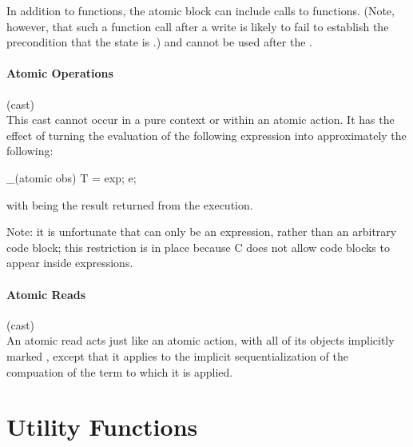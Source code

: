 \documentclass[preprint,nocopyrightspace]{sigplanconf}
\newcommand{\subsubsubsection}[1]{\paragraph{#1}}
\begin{document}
{{{\begin{VCC}
In addition to  functions, the atomic block can
include calls to  functions. (Note, however, that such a
function call after a write is likely to fail to establish the
precondition that the state is .) 
and  cannot be used after the .

\subsubsubsection{Atomic Operations}

\noindent{} (cast)\\
This cast cannot occur in a pure context or within an atomic action.
It has the effect of turning the evaluation of the following
expression  into approximately the following:
\begin{VCC}
_(atomic obs) {
  T \result = exp;
  e;
}
\end{VCC}
with \vcc{\result} being the result returned from the execution. 

Note: it is unfortunate that  can only be an expression, rather
than an arbitrary code block; this restriction is in place because C
does not allow code blocks to appear inside expressions. 

\subsubsubsection{Atomic Reads}

 (cast)\\
An atomic read acts just like an atomic action, with all of its
objects implicitly marked , except that it applies
to the implicit sequentialization of the compuation of the term to
which it is applied.

\section{Utility Functions}




\end{VCC}}}}
\end{document}
